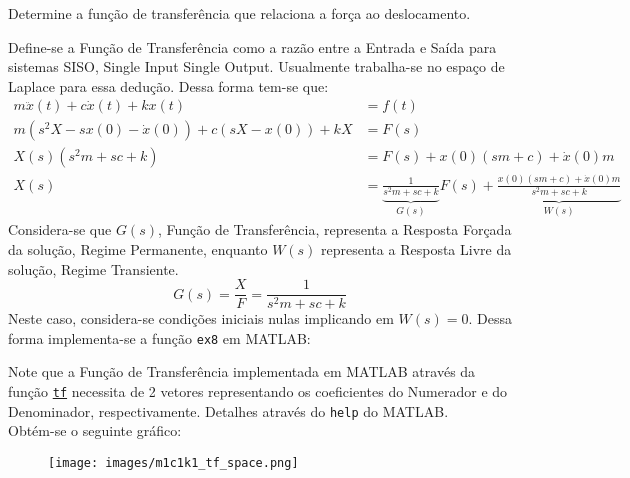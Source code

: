 \documentclass{article}
\begin{document}
\newpage
\begin{exercise}\label{ex8}
    Determine a função de transferência que relaciona a força ao deslocamento.
\end{exercise}
\begin{resolution}
    Define-se a Função de Transferência como a razão entre a Entrada e Saída para sistemas SISO, Single Input Single Output. Usualmente trabalha-se no espaço de Laplace para essa dedução. Dessa forma tem-se que:
    \begin{align*}
        m\ddot{x}(t) + c\dot{x}(t) + k x(t) &= f(t)\\
        m(s^2 X - sx(0) - \dot{x}(0)) + c(s X - x(0)) + kX &= F(s)\\
        X(s)(s^2m + sc + k) &= F(s) + x(0)(sm + c) + \dot{x}(0)m\\
        X(s) &= 
        \underbrace{\frac{1}{s^2m + sc + k}}_{G(s)} F(s) + 
        \underbrace{\frac{x(0)(sm + c) + \dot{x}(0)m}{s^2m + sc + k}}_{W(s)}
    \end{align*}
    Considera-se que $G(s)$, Função de Transferência, representa a Resposta Forçada da solução, Regime Permanente, enquanto $W(s)$ representa a Resposta Livre da solução, Regime Transiente.
    \begin{equation}
        \boxed{G(s) = \frac{X}{F} = \frac{1}{s^2m + sc + k}}
    \end{equation}
    Neste caso, considera-se condições iniciais nulas implicando em $W(s) = 0$. Dessa forma implementa-se a função \texttt{ex8} em MATLAB:
    \begin{scriptsize}
        \myMatlab
    \end{scriptsize}
    Note que a Função de Transferência implementada em MATLAB através da função \href{https://www.mathworks.com/help/control/ref/tf.html}{\texttt{tf}} necessita de 2 vetores representando os coeficientes do Numerador e do Denominador, respectivamente. Detalhes através do \texttt{help} do MATLAB.\\

    Obtém-se o seguinte gráfico:
    \begin{figure}[H]
        \centering
        \texttt{[image: images/m1c1k1\_tf\_space.png]}
    \end{figure}
\end{resolution}
\end{document}
